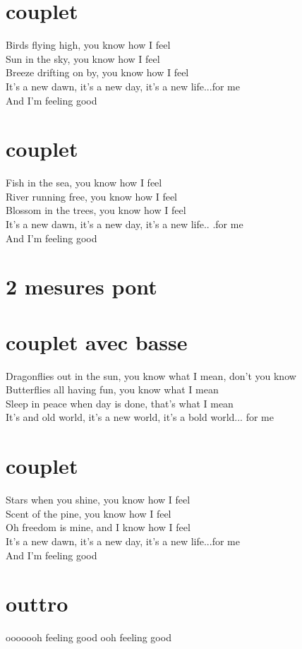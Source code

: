 \section*{couplet}

Birds flying high, you know how I feel \\
Sun in the sky, you know how I feel \\
Breeze drifting on by, you know how I feel \\
It's a new dawn, it's a new day, it's a new life...for me \\
And I'm feeling good \\


\section*{couplet}

Fish in the sea, you know how I feel \\
River running free, you know how I feel \\
Blossom in the trees, you know how I feel \\
It's a new dawn, it's a new day, it's a new life..  .for me \\
And I'm feeling good \\
\section*{2 mesures pont}
\section*{couplet avec basse}
Dragonflies out in the sun, you know what I mean, don't you know \\
Butterflies all having fun, you know what I mean \\
Sleep in peace when day is done, that's what I mean \\
It's and old world, it's a new world, it's a bold world...  for me \\
\section*{couplet}
Stars when you shine, you know how I feel \\
Scent of the pine, you know how I feel \\
Oh freedom is mine, and I know how I feel \\
It's a new dawn, it's a new day, it's a new life...for me \\
And I'm feeling good \\
\section*{outtro}
ooooooh feeling good ooh feeling good

